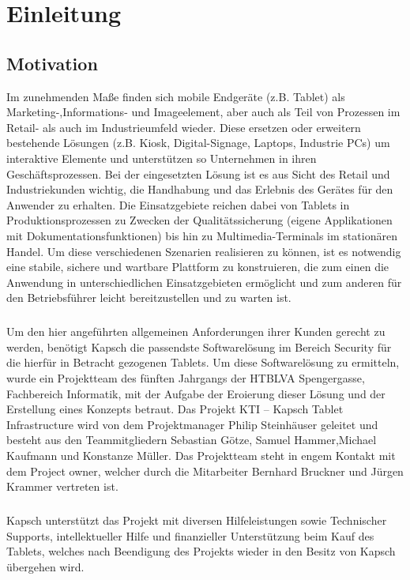 \chapter{Einleitung}
\section{Motivation}
Im zunehmenden Maße finden sich mobile Endgeräte (z.B. Tablet) als Marketing-,\newline Informations- und Imageelement, aber auch als Teil von Prozessen im Retail- als auch im Industrieumfeld wieder. Diese ersetzen oder erweitern bestehende Lösungen (z.B. Kiosk, Digital-Signage, Laptops, Industrie PCs) um interaktive Elemente und unterstützen so Unternehmen in ihren Geschäftsprozessen. 
Bei der eingesetzten Lösung ist es aus Sicht des Retail und Industriekunden wichtig, die Handhabung und das Erlebnis des Gerätes für den Anwender zu erhalten. Die Einsatzgebiete reichen dabei von Tablets in Produktionsprozessen zu Zwecken der Qualitätssicherung (eigene Applikationen mit Dokumentationsfunktionen) bis hin zu Multimedia-Terminals im stationären Handel. Um diese verschiedenen Szenarien realisieren zu können, ist es notwendig eine stabile, sichere und wartbare Plattform zu konstruieren, die zum einen die Anwendung in unterschiedlichen Einsatzgebieten ermöglicht und zum anderen für den Betriebsführer leicht bereitzustellen und zu warten ist.
\paragraph*{}
Um den hier angeführten allgemeinen Anforderungen ihrer Kunden gerecht zu werden, benötigt Kapsch die passendste Softwarelösung im Bereich Security für die hierfür in Betracht gezogenen Tablets. Um diese Softwarelösung zu ermitteln, wurde ein Projektteam des fünften Jahrgangs der HTBLVA Spengergasse, Fachbereich Informatik, mit der Aufgabe der Eroierung dieser Lösung und  der Erstellung eines Konzepts betraut. Das Projekt KTI – Kapsch Tablet Infrastructure wird von dem Projektmanager Philip Steinhäuser geleitet  und besteht aus den Teammitgliedern Sebastian Götze, Samuel Hammer,\newline Michael Kaufmann und Konstanze Müller. Das Projektteam steht in engem Kontakt mit dem Project owner, welcher durch die Mitarbeiter Bernhard Bruckner und Jürgen Krammer vertreten ist. 
\paragraph*{}
Kapsch unterstützt das Projekt mit diversen Hilfeleistungen sowie Technischer Supports, intellektueller Hilfe und finanzieller Unterstützung beim Kauf des Tablets, welches nach Beendigung des Projekts wieder in den Besitz von Kapsch übergehen wird.

